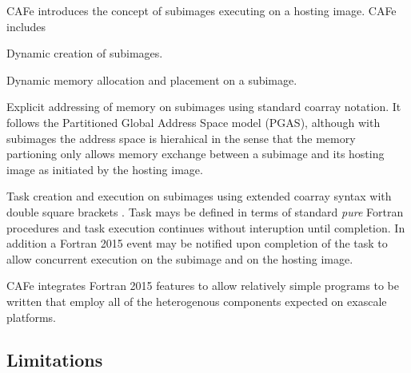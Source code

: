 CAFe introduces the concept of subimages executing on a hosting image.  CAFe includes
\item
  Dynamic creation of subimages.
\item
  Dynamic memory allocation and placement on a subimage.
\item
  Explicit addressing of memory on subimages using standard coarray notation.  It follows
  the Partitioned Global Address Space model (PGAS), although with subimages the address
  space is hierahical in the sense that the memory partioning only allows memory exchange
  between a subimage and its hosting image as initiated by the hosting image.
\item
  Task creation and execution on subimages using extended coarray syntax with double
  square brackets \testtt{[[ ]]}.  Task mays be defined in terms of standard \emph{pure}
  Fortran procedures and task execution continues without interuption until completion.
  In addition a Fortran 2015 event may be notified upon completion of the task to allow
  concurrent execution on the subimage and on the hosting image.
\item
  CAFe integrates Fortran 2015 features to allow relatively simple programs to be written
  that employ all of the heterogenous components expected on exascale platforms.

\subsection{Limitations}

